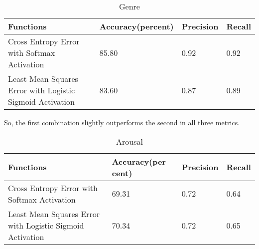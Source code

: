 \begin{table}[h!]
        \caption{Genre}
        \begin{center}
            \begin{tabular}{|p{8cm}|l|l|l|}
                        \hline

                        \textbf{Functions}
                        &
                        \textbf{Accuracy(percent)}
                        &
                        \textbf{Precision}
                        &
                        \textbf{Recall}
                        \\\hline

Cross Entropy Error with Softmax Activation
&
85.80
&
0.92
&
0.92
\\\hline

Least Mean Squares Error with Logistic Sigmoid Activation 
&
83.60
&
0.87
&
0.89
\\\hline
                 \end{tabular}
        \end{center}
\end{table}
So, the first combination slightly outperforms the second in all three metrics. 
\begin{table}[h!]
        \caption{Arousal}
        \begin{center}
            \begin{tabular}{|p{8cm}|l|l|l|}
                        \hline

                        \textbf{Functions}
                        &
                        \textbf{Accuracy(per cent)}
                        &
                        \textbf{Precision}
                        &
                        \textbf{Recall}
                        \\\hline

                        Cross Entropy Error with Softmax Activation
                        &
                        69.31
                        &
                        0.72
                        &
                        0.64
                        \\\hline
                        
                        Least Mean Squares Error with Logistic Sigmoid Activation 
                        &
                        70.34
                        &
                        0.72
                        &
                        0.65
                        \\\hline

                 \end{tabular}
        \end{center}
\end{table}
